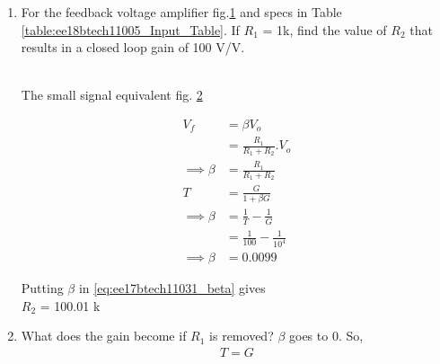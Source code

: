 \begin{enumerate}[label=\thesection.\arabic*.,ref=\thesection.\theenumi]
\item For the feedback voltage amplifier fig.\ref{fig:Original ckt} and specs in Table \ref{table:ee18btech11005_Input_Table}. If $R_{1}$ = 1k\ohm , find the value of $R_{2}$ that results in a closed loop gain of 100 V/V.

\begin{figure}[!ht]
	\begin{center}
			\resizebox{\columnwidth}{!}{}
	\end{center}
\caption{}
\label{fig:Original ckt}
\end{figure}

\begin{table}[!ht]
\centering

\caption{}
\label{table:ee18btech11005_Input_Table}
\end{table}

\\
\solution The small signal equivalent fig. \ref{fig:small ckt}
\begin{figure}[!ht]
	\begin{center}
			\resizebox{\columnwidth}{!}{}
	\end{center}
\caption{}
\label{fig:small ckt}
\end{figure}

\begin{align}
V_{f} &= \beta V_{o}\\ 
&= \frac{R_{1}}{R_{1}+R_{2}}.V_{o}\\
 \implies \beta &= \frac{R_{1}}{R_{1}+R_{2}}
\label{eq:ee17btech11031_beta}\\
T &= \frac{G}{1+\beta G}\\
\implies \beta &= \frac{1}{T} - \frac{1}{G}\\
&= \frac{1}{100} - \frac{1}{10^4}\\
\implies \beta &= 0.0099
\end{align}

Putting $\beta$ in \eqref{eq:ee17btech11031_beta} gives\\
\implies $R_2$ = 100.01 k\ohm

\item What does the gain become if $R_1$ is removed?
\solution $\beta$ goes to 0. So,
\begin{align}
    T = G
\end{align}
\end{enumerate}

